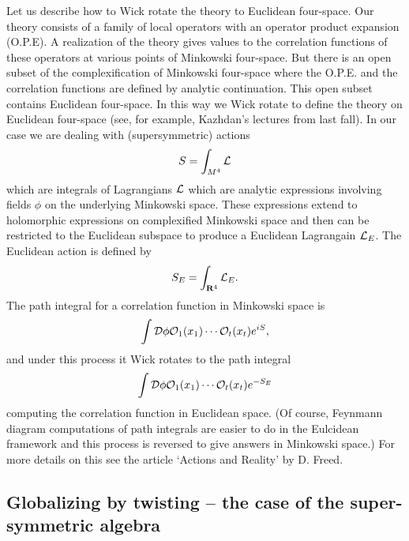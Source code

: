 \documentclass[10pt]{article}
\begin{document}
Let us describe how to  Wick rotate
the theory to Euclidean four-space.  Our theory
consists of  a family of local operators with an operator product
expansion (O.P.E).  A realization of the theory
gives values to the  correlation functions of these operators at
various points of Minkowski four-space.  But there is an open subset
of the complexification of Minkowski four-space where the O.P.E. and the
correlation functions are defined by analytic continuation.  This open
subset contains Euclidean four-space.  In this way we Wick rotate to
define the theory on Euclidean four-space (see, for
example, Kazhdan's lectures from last fall).
In our case we are dealing with (supersymmetric) actions 
$$S=\int_{M^4} {\cal L}$$
which  are integrals of Lagrangians ${\cal L}$ which are analytic
expressions involving fields $\phi$ on the underlying Minkowski space.
These expressions extend to holomorphic expressions on  complexified
Minkowski space and then can be restricted to the Euclidean subspace
to produce a Euclidean Lagrangain ${\cal L}_E$.
The Euclidean action is defined by
$$S_E=\int_{{\bf R}^4}{\cal L}_E.$$
The path integral for a correlation function in Minkowski space is 
$$\int{\cal D}\phi {\cal O}_1(x_1)\cdots{\cal O}_t(x_t)e^{iS},$$
and under this process it Wick rotates to the path integral 
$$\int{\cal D}\phi {\cal O}_1(x_1)\cdots{\cal O}_t(x_t)e^{-S_E}$$
computing the correlation function in Euclidean space.  (Of course,
Feynmann diagram computations of path integrals are easier to do in
the Eulcidean framework and this process is reversed to give answers
in Minkowski space.) For more details on this see the article `Actions
and Reality' by D. Freed.

\subsection{Globalizing by twisting -- the case of the super-symmetric
algebra} 
\end{document}
